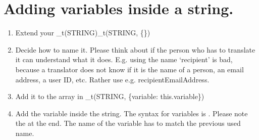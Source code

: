 \documentclass[letterpaper,10pt,openany,oneside,english]{sphinxmanual}
\begin{document}
\chapter{Adding variables inside a string.}
\label{\detokenize{translating-dev:adding-variables-inside-a-string}}\begin{enumerate}
%
\item {} 
\sphinxAtStartPar
Extend your \_t(STRING)\_t(STRING, \{\})\textasciigrave{}\textasciigrave{}

\item {} 
\sphinxAtStartPar
Decide how to name it. Please think about if the person who has to translate it can understand what it does. E.g. using the name ‘recipient’ is bad, because a translator does not know if it is the name of a person, an email address, a user ID, etc. Rather use e.g. recipientEmailAddress.

\item {} 
\sphinxAtStartPar
Add it to the array in \_t(STRING, \{variable: this.variable\})\textasciigrave{}\textasciigrave{}

\item {} 
\sphinxAtStartPar
Add the variable inside the string. The syntax for variables is . Please note the  at the end. The name of the variable has to match the previous used name.

\end{enumerate}
\end{document}
